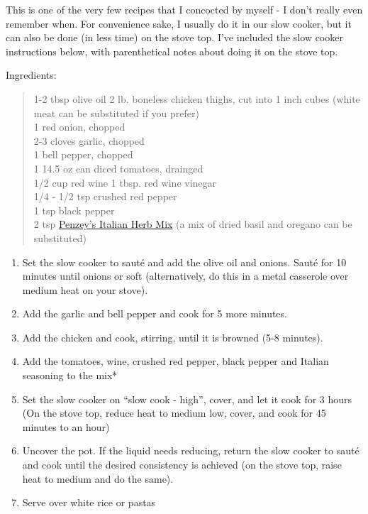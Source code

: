 \documentclass[
]{book}
\providecommand{\tightlist}{%
  \setlength{\itemsep}{0pt}\setlength{\parskip}{0pt}}
\begin{document}
This is one of the very few recipes that I concocted by myself - I don't really even remember when. For convenience sake, I usually do it in our slow cooker, but it can also be done (in less time) on the stove top. I've included the slow cooker instructions below, with parenthetical notes about doing it on the stove top.

Ingredients:

\begin{quote}
1-2 tbsp olive oil
2 lb. boneless chicken thighs, cut into 1 inch cubes (white meat can be substituted if you prefer)\\
1 red onion, chopped\\
2-3 cloves garlic, chopped\\
1 bell pepper, chopped\\
1 14.5 oz can diced tomatoes, drainged\\
1/2 cup red wine
1 tbsp. red wine vinegar\\
1/4 - 1/2 tsp crushed red pepper\\
1 tsp black pepper\\
2 tsp \href{https://www.penzeys.com/online-catalog/italian-herb-mix/c-24/p-183/pd-s}{Penzey's Italian Herb Mix} (a mix of dried basil and oregano can be substituted)
\end{quote}

\begin{enumerate}
\def\labelenumi{\arabic{enumi}.}
\tightlist
\item
  Set the slow cooker to sauté and add the olive oil and onions. Sauté for 10 minutes until onions or soft (alternatively, do this in a metal casserole over medium heat on your stove).\\
\item
  Add the garlic and bell pepper and cook for 5 more minutes.
\item
  Add the chicken and cook, stirring, until it is browned (5-8 minutes).\\
\item
  Add the tomatoes, wine, crushed red pepper, black pepper and Italian seasoning to the mix*
\item
  Set the slow cooker on ``slow cook - high'', cover, and let it cook for 3 hours (On the stove top, reduce heat to medium low, cover, and cook for 45 minutes to an hour)
\item
  Uncover the pot. If the liquid needs reducing, return the slow cooker to sauté and cook until the desired consistency is achieved (on the stove top, raise heat to medium and do the same).
\item
  Serve over white rice or pastas
\end{enumerate}
\end{document}
